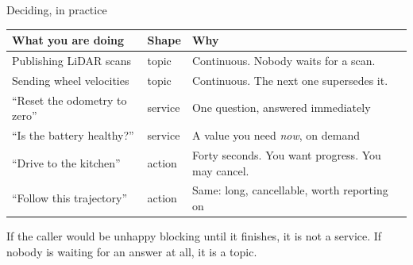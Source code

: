 \documentclass[aspectratio=169]{beamer}
\begin{document}
\begin{frame}{Deciding, in practice}
  \footnotesize
  \begin{center}
  \begin{tabular}{@{}p{3.9cm}p{1.7cm}p{4.9cm}@{}}
    \toprule
    \textbf{What you are doing} & \textbf{Shape} & \textbf{Why} \\
    \midrule
    Publishing LiDAR scans & topic & Continuous. Nobody waits for a scan. \\[0.2em]
    Sending wheel velocities & topic & Continuous. The next one supersedes it. \\[0.2em]
    ``Reset the odometry to zero'' & service & One question, answered immediately \\[0.2em]
    ``Is the battery healthy?'' & service & A value you need \emph{now}, on demand \\[0.2em]
    ``Drive to the kitchen'' & action & Forty seconds. You want progress. You may cancel. \\[0.2em]
    ``Follow this trajectory'' & action & Same: long, cancellable, worth reporting on \\
    \bottomrule
  \end{tabular}
  \end{center}

  \begin{underhood}
    \footnotesize
    If the caller would be unhappy blocking until it finishes, it is not a service. If nobody
    is waiting for an answer at all, it is a topic.
  \end{underhood}
\end{frame}
\end{document}
